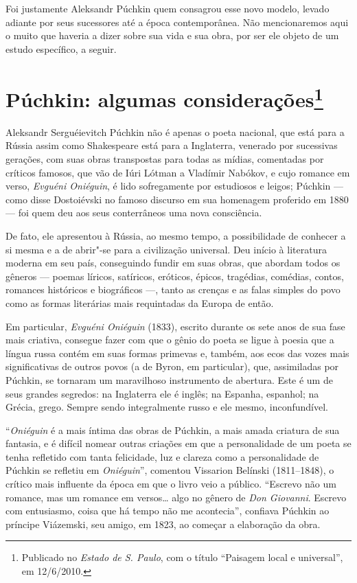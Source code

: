 Foi justamente Aleksandr Púchkin quem consagrou esse novo modelo, levado
adiante por seus sucessores até a época contemporânea. Não mencionaremos
aqui o muito que haveria a dizer sobre sua vida e sua obra, por ser ele
objeto de um estudo específico, a seguir.

\chapter{Púchkin: algumas considerações\footnote{Publicado no \emph{Estado de S. Paulo}, com o título ``Paisagem local e universal'', em 12/6/2010.}}
\label{puchkin2}

Aleksandr Serguéievitch Púchkin não é apenas o poeta nacional, que está
para a Rússia assim como Shakespeare está para a Inglaterra, venerado
por sucessivas gerações, com suas obras transpostas para todas as
mídias, comentadas por críticos famosos, que vão de Iúri Lótman a
Vladímir Nabókov, e cujo romance em verso, \emph{Evguéni Oniéguin}, é lido
sofregamente por estudiosos e leigos; Púchkin --- como disse
Dostoiévski no famoso discurso em sua homenagem proferido em 1880 --- foi quem deu aos seus conterrâneos uma nova consciência.

De fato, ele apresentou à Rússia, ao mesmo tempo, a possibilidade de
conhecer a si mesma e a de abrir"-se para a civilização universal.
Deu início à literatura moderna em seu país, conseguindo fundir em suas obras, que abordam todos os gêneros --- poemas
líricos, satíricos, eróticos, épicos, tragédias, comédias, contos,
romances históricos e biográficos ---, tanto as crenças e as falas simples
do povo como as formas literárias mais requintadas da Europa de então.

Em particular, \emph{Evguéni Oniéguin} (1833), escrito durante os
sete anos de sua fase mais criativa, consegue fazer com que o gênio do poeta se ligue à poesia
que a língua russa contém em suas formas primevas e, também, aos ecos das
vozes mais significativas de outros povos (a de Byron, em particular),
que, assimiladas por Púchkin, se tornaram um maravilhoso instrumento de
abertura. Este é um de seus grandes segredos: na Inglaterra ele é
inglês; na Espanha, espanhol; na Grécia, grego. Sempre sendo
integralmente russo e ele mesmo, inconfundível.

``\emph{Oniéguin} é a mais íntima das obras de Púchkin, a mais amada criatura de
sua fantasia, e é difícil nomear outras criações em que a personalidade
de um poeta se tenha refletido com tanta felicidade, luz e clareza como
a personalidade de Púchkin se refletiu em \emph{Oniéguin}'', comentou Vissarion
Belínski (1811--1848), o crítico mais influente da época em que o livro veio a
público. ``Escrevo não um romance, mas um romance em versos\ldots{} algo no
gênero de \emph{Don Giovanni}. Escrevo com entusiasmo, coisa que há tempo não
me acontecia'', confiava Púchkin ao príncipe Viázemski, seu amigo, em
1823, ao começar a elaboração da obra.

